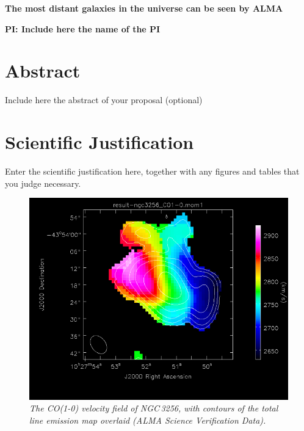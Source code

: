 \documentclass{alma_proposal}
\begin{document}
 

\begin{center}
{\LARGE{\bf
{The most distant galaxies in the universe can be seen by ALMA}
}}
\end{center}
\bigskip

\centerline{\bf PI: 
{Include here the name of the PI}}

\bigskip


\section{Abstract}
Include here the abstract of your proposal (optional)



\section{Scientific Justification}

Enter the scientific justification here, together with any figures and tables that you judge necessary.
 
\begin{figure}[tbh]
\includegraphics[scale=0.2]{CO_velfield.png}
\caption{\em{The CO(1-0) velocity field of NGC\,3256, with contours 
of the total line emission map overlaid (ALMA Science Verification Data).
}}
\end{figure}
\end{document}
